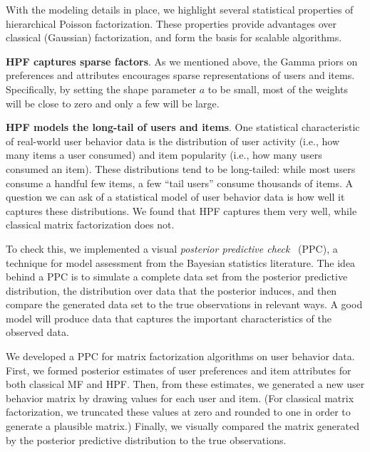 With the modeling details in place, we highlight several statistical
properties of hierarchical Poisson factorization.  These properties
provide advantages over classical (Gaussian) factorization, and
form the basis for scalable algorithms.

{\bf HPF captures sparse factors}.  As we mentioned above, the
  Gamma priors on preferences and attributes encourages sparse
  representations of users and items.  Specifically, by setting the
  shape parameter $a$ to be small, most of the weights will be close
  to zero and only a few will be large.


{\bf HPF models the long-tail of users and items}.  One statistical
characteristic of real-world user behavior data is the distribution of
user activity (i.e., how many items a user consumed) and item
popularity (i.e., how many users consumed an item).  These
distributions tend to be long-tailed: while most users consume a
handful few items, a few ``tail users'' consume thousands of items.  A
question we can ask of a statistical model of user behavior data is
how well it captures these distributions.  We found that HPF captures
them very well, while classical matrix factorization does not.

To check this, we implemented a visual \textit{posterior predictive
  check}~\cite{Rubin:1984,Gelman:1996} (PPC), a technique for model
assessment from the Bayesian statistics literature.  The idea behind a
PPC is to simulate a complete data set from the posterior predictive
distribution, the distribution over data that the posterior induces,
and then compare the generated data set to the true observations in
relevant ways.  A good model will produce data that captures the
important characteristics of the observed data.

We developed a PPC for matrix factorization algorithms on user
behavior data.  First, we formed posterior estimates of user
preferences and item attributes for both classical MF and HPF.  Then,
from these estimates, we generated a new user behavior matrix by
drawing values for each user and item.  (For classical matrix
factorization, we truncated these values at zero and rounded to one in
order to generate a plausible matrix.)  Finally, we visually compared
the matrix generated by the posterior predictive distribution to the
true observations.

